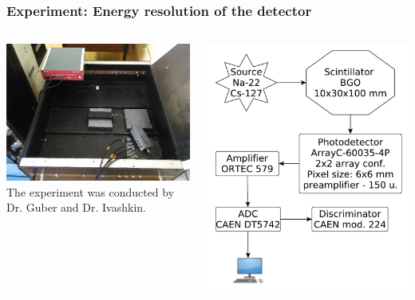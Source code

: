 \documentclass[11pt]{beamer}
\begin{document}
\begin{frame}
    \frametitle{Experiment: Energy resolution of the detector}
    \begin{columns}
        \begin{column}{0.5\textwidth}
            
            \includegraphics[width=1\textwidth]{figures/setup1.png}\\
            The experiment was conducted by Dr. Guber and Dr. Ivashkin.
        \end{column}
                \begin{column}{0.5\textwidth}
            \includegraphics[width=1\textwidth]{figures/yed.pdf}
        \end{column}
    \end{columns}  
\end{frame}
\end{document}
